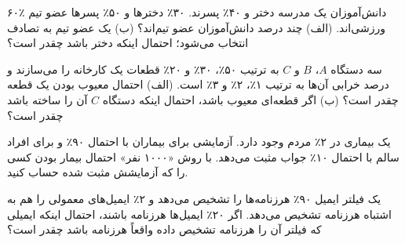 \begin{exercise}
۶۰٪ دانش‌آموزان یک مدرسه دختر و ۴۰٪ پسرند. ۳۰٪ دخترها و ۵۰٪ پسرها عضو تیم ورزشی‌اند. (الف) چند درصد دانش‌آموزان عضو تیم‌اند؟ (ب) یک عضو تیم به تصادف انتخاب می‌شود؛ احتمال اینکه دختر باشد چقدر است؟
\end{exercise}

\begin{exercise}
سه دستگاه $A$، $B$ و $C$ به ترتیب ۵۰٪، ۳۰٪ و ۲۰٪ قطعات یک کارخانه را می‌سازند و درصد خرابی آن‌ها به ترتیب ۱٪، ۲٪ و ۳٪ است. (الف) احتمال معیوب بودن یک قطعه چقدر است؟ (ب) اگر قطعه‌ای معیوب باشد، احتمال اینکه دستگاه $C$ آن را ساخته باشد چقدر است؟
\end{exercise}

\begin{exercise}
یک بیماری در ۲٪ مردم وجود دارد. آزمایشی برای بیماران با احتمال ۹۰٪ و برای افراد سالم با احتمال ۱۰٪ جواب مثبت می‌دهد. با روش «۱۰۰۰ نفر» احتمال بیمار بودن کسی را که آزمایشش مثبت شده حساب کنید.
\end{exercise}

\begin{exercise}
یک فیلتر ایمیل ۹۰٪ هرزنامه‌ها را تشخیص می‌دهد و ۲٪ ایمیل‌های معمولی را هم به اشتباه هرزنامه تشخیص می‌دهد. اگر ۲۰٪ ایمیل‌ها هرزنامه باشند، احتمال اینکه ایمیلی که فیلتر آن را هرزنامه تشخیص داده واقعاً هرزنامه باشد چقدر است؟
\end{exercise}
